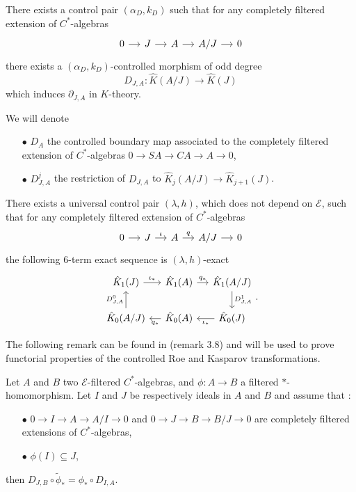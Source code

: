 \begin{prop}
There exists a control pair $(\alpha_D,k_D)$ such that for any completely filtered extension of $C^*$-algebras
\[\begin{tikzcd}[column sep = small]0\arrow{r} & J\arrow{r} & A\arrow{r} & A/J\arrow{r} & 0 \end{tikzcd}\]
there exists a $(\alpha_D,k_D)$-controlled morphism of odd degree
\[D_{J,A} : \hat K(A/J)\rightarrow \hat K(J)\]
which induces $\partial_{J,A}$ in $K$-theory.
\end{prop}

We will denote 
\begin{itemize}
\item[$\bullet$] $D_A$ the controlled boundary map associated to the completely filtered extension of $C^*$-algebras $0 \rightarrow SA \rightarrow CA \rightarrow A \rightarrow 0 $,
\item[$\bullet$] $D^j_{J,A}$ the restriction of $D_{J,A}$ to $\hat K_j(A/J)\rightarrow \hat K_{j+1}(J)$.
\end{itemize} 

\begin{thm}
There exists a universal control pair $(\lambda,h)$, which does not depend on $\mathcal E$, such that for any completely filtered extension of $C^*$-algebras 
\[\begin{tikzcd}[column sep = small]0\arrow{r} & J\arrow{r}{\iota} & A\arrow{r}{q} & A/J\arrow{r} & 0 \end{tikzcd}\]
the following $6$-term exact sequence is $(\lambda,h)$-exact
\[\begin{tikzcd}[column sep = small]
 \hat K_1(J) \arrow{r}{\iota_*} & \hat K_1(A) \arrow{r}{q_*} & \hat K_1(A/J)\arrow{d}{D^1_{J,A}} \\
 \hat K_0(A/J) \arrow{u}{D^0_{J,A}} & \hat K_0(A) \arrow{l}{q_*} & \hat K_0(J)\arrow{l}{\iota_*}
\end{tikzcd}.\]
\end{thm}

The following remark can be found in \cite{OY2} (remark $3.8$) and will be used to prove functorial properties of the controlled Roe and Kasparov transformations.

\begin{rk}\label{rk3.8}
Let $A$ and $B$ two $\mathcal E$-filtered $C^*$-algebras, and $\phi : A\rightarrow B$ a filtered $*$-homomorphism. Let $I$ and $J$ be respectively ideals in $A$ and $B$ and assume that :
\begin{itemize}
\item[$\bullet$] $0 \rightarrow I \rightarrow A \rightarrow A/ I \rightarrow 0$ and $0 \rightarrow J \rightarrow B \rightarrow B/J \rightarrow 0$ are completely filtered extensions of $C^*$-algebras,
\item[$\bullet$] $\phi(I)\subseteq J$,
\end{itemize}
then $D_{J,B}\circ \tilde\phi_* = \phi_* \circ D_{I,A}$.
\end{rk}

